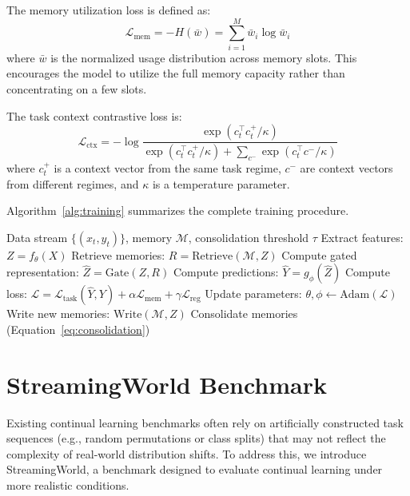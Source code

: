 \documentclass[11pt]{article}
\begin{document}
The memory utilization loss is defined as:
\begin{equation}
    \mathcal{L}_{\text{mem}} = -H(\bar{w}) = \sum_{i=1}^{M} \bar{w}_i \log \bar{w}_i
\end{equation}
where $\bar{w}$ is the normalized usage distribution across memory slots. This encourages the model to utilize the full memory capacity rather than concentrating on a few slots.


The task context contrastive loss is:
\begin{equation}
    \mathcal{L}_{\text{ctx}} = -\log \frac{\exp(c_t^\top c_t^+ / \kappa)}{\exp(c_t^\top c_t^+ / \kappa) + \sum_{c^-} \exp(c_t^\top c^- / \kappa)}
\end{equation}
where $c_t^+$ is a context vector from the same task regime, $c^-$ are context vectors from different regimes, and $\kappa$ is a temperature parameter.

Algorithm~\ref{alg:training} summarizes the complete training procedure.

\begin{algorithm}
\caption{AMN Training}
\label{alg:training}
\begin{algorithmic}[1]
\REQUIRE Data stream $\{(x_t, y_t)\}$, memory $\mathcal{M}$, consolidation threshold $\tau$
    \STATE Extract features: $Z = f_\theta(X)$
    \STATE Retrieve memories: $R = \text{Retrieve}(\mathcal{M}, Z)$
    \STATE Compute gated representation: $\hat{Z} = \text{Gate}(Z, R)$
    \STATE Compute predictions: $\hat{Y} = g_\phi(\hat{Z})$
    \STATE Compute loss: $\mathcal{L} = \mathcal{L}_{\text{task}}(\hat{Y}, Y) + \alpha \mathcal{L}_{\text{mem}} + \gamma \mathcal{L}_{\text{reg}}$
    \STATE Update parameters: $\theta, \phi \leftarrow \text{Adam}(\mathcal{L})$
    \STATE Write new memories: $\text{Write}(\mathcal{M}, Z)$
        \STATE Consolidate memories (Equation~\ref{eq:consolidation})
    \ENDIF
\ENDFOR
\end{algorithmic}
\end{algorithm}

\section{StreamingWorld Benchmark}
\label{sec:benchmark}

Existing continual learning benchmarks often rely on artificially constructed task sequences (e.g., random permutations or class splits) that may not reflect the complexity of real-world distribution shifts. To address this, we introduce StreamingWorld, a benchmark designed to evaluate continual learning under more realistic conditions.
\end{document}
